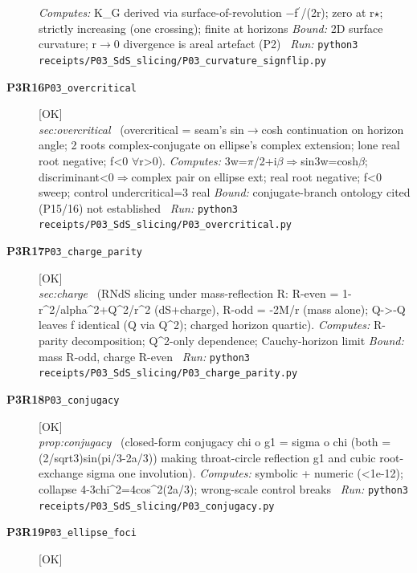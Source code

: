 \begin{description}
\emph{Computes:} K\_G derived via surface-of-revolution \ensuremath{-}f\ensuremath{{}^\prime}/(2r); zero at r\ensuremath{\star}; strictly increasing (one crossing); finite at horizons
 \emph{Bound:} 2D surface curvature; r\ensuremath{\to}0 divergence is areal artefact (P2)
\ \emph{Run:} \texttt{python3 receipts/P03\_SdS\_slicing/P03\_curvature\_signflip.py}
\item[\rcptlabel{P03_overcritical}{P3R16}\textbf{P3R16}\quad\texttt{P03\_overcritical}]\hfill\textsf{[OK]}\\
\textit{sec:overcritical} \ (overcritical = seam's sin\ensuremath{\to}cosh continuation on horizon angle; 2 roots complex-conjugate on ellipse's complex extension; lone real root negative; f<0 \ensuremath{\forall}r>0). 
\emph{Computes:} 3w=\ensuremath{\pi}/2+i\ensuremath{\beta}\ensuremath{\Rightarrow}sin3w=cosh\ensuremath{\beta}; discriminant<0\ensuremath{\Rightarrow}complex pair on ellipse ext; real root negative; f<0 sweep; control undercritical=3 real
 \emph{Bound:} conjugate-branch ontology cited (P15/16) not established
\ \emph{Run:} \texttt{python3 receipts/P03\_SdS\_slicing/P03\_overcritical.py}
\item[\rcptlabel{P03_charge_parity}{P3R17}\textbf{P3R17}\quad\texttt{P03\_charge\_parity}]\hfill\textsf{[OK]}\\
\textit{sec:charge} \ (RNdS slicing under mass-reflection R: R-even = 1-r\textasciicircum{}2/alpha\textasciicircum{}2+Q\textasciicircum{}2/r\textasciicircum{}2 (dS+charge), R-odd = -2M/r (mass alone); Q->-Q leaves f identical (Q via Q\textasciicircum{}2); charged horizon quartic). 
\emph{Computes:} R-parity decomposition; Q\textasciicircum{}2-only dependence; Cauchy-horizon limit
 \emph{Bound:} mass R-odd, charge R-even
\ \emph{Run:} \texttt{python3 receipts/P03\_SdS\_slicing/P03\_charge\_parity.py}
\item[\rcptlabel{P03_conjugacy}{P3R18}\textbf{P3R18}\quad\texttt{P03\_conjugacy}]\hfill\textsf{[OK]}\\
\textit{prop:conjugacy} \ (closed-form conjugacy chi o g1 = sigma o chi (both = (2/sqrt3)sin(pi/3-2a/3)) making throat-circle reflection g1 and cubic root-exchange sigma one involution). 
\emph{Computes:} symbolic + numeric (<1e-12); collapse 4-3chi\textasciicircum{}2=4cos\textasciicircum{}2(2a/3); wrong-scale control breaks
\ \emph{Run:} \texttt{python3 receipts/P03\_SdS\_slicing/P03\_conjugacy.py}
\item[\rcptlabel{P03_ellipse_foci}{P3R19}\textbf{P3R19}\quad\texttt{P03\_ellipse\_foci}]\hfill\textsf{[OK]}\\

\end{description}
